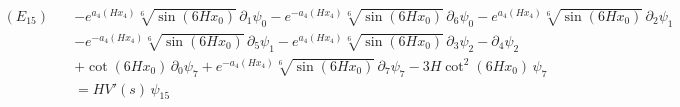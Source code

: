 \begin{align*}
(E_{15})\quad & -e^{a_4\left(H x_4\right)} \sqrt[6]{\sin \left(6 H x_0\right)}\,\partial_{1}\psi_{0} - e^{-a_4\left(H x_4\right)} \sqrt[6]{\sin \left(6 H x_0\right)}\,\partial_{6}\psi_{0} - e^{a_4\left(H x_4\right)} \sqrt[6]{\sin \left(6 H x_0\right)}\,\partial_{2}\psi_{1} \\
 &  - e^{-a_4\left(H x_4\right)} \sqrt[6]{\sin \left(6 H x_0\right)}\,\partial_{5}\psi_{1} - e^{a_4\left(H x_4\right)} \sqrt[6]{\sin \left(6 H x_0\right)}\,\partial_{3}\psi_{2} - \partial_{4}\psi_{2} \\
 &  + \cot \left(6 H x_0\right)\,\partial_{0}\psi_{7} + e^{-a_4\left(H x_4\right)} \sqrt[6]{\sin \left(6 H x_0\right)}\,\partial_{7}\psi_{7} - 3 H \cot ^2\left(6 H x_0\right)\,\psi_{7} \\
 & = H V'(s)\,\psi_{15}
\end{align*}
